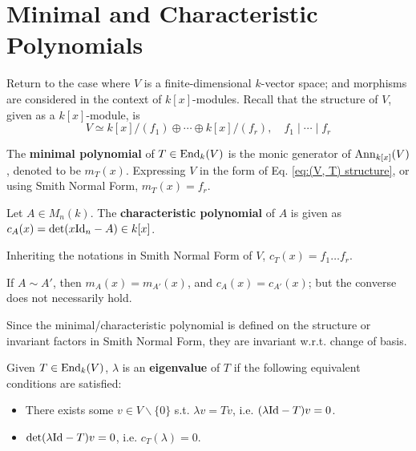 \documentclass{article}
\begin{document}
\section{Minimal and Characteristic Polynomials}

Return to the case where $V$ is a finite-dimensional $k$-vector space; and morphisms are considered in the context of $k[x]$-modules. Recall that the structure of $V$, given as a $k[x]$-module, is 
\[
    V \simeq k[x]/(f_1) \oplus \cdots \oplus k[x]/(f_r), \quad f_1 \mid \cdots \mid f_r
\]

\begin{definition}
    The \textbf{minimal polynomial} of $T\in \mathrm{End}_{k}(V)$ is the monic generator of $\mathrm{Ann}_{k[x]}(V)$, denoted to be $m_T(x)$. Expressing $V$ in the form of Eq. \eqref{eq:(V, T) structure}, or using Smith Normal Form, $m_T(x) = f_r$.
\end{definition}

\begin{definition}
    Let $A \in M_n(k)$. The \textbf{characteristic polynomial} of $A$ is given as $c_A(x) = \det(x\mathrm{Id}_n - A) \in k[x]$. 
\end{definition}

\begin{remark}
    Inheriting the notations in Smith Normal Form of $V$, $c_T(x) = f_1\ldots f_r$.
\end{remark}

\begin{remark}
    If $A \sim A'$, then $m_A(x) = m_{A'}(x)$, and $c_A(x) = c_{A'}(x)$; but the converse does not necessarily hold.
\end{remark}

\begin{remark}
    Since the minimal/characteristic polynomial is defined on the structure or invariant factors in Smith Normal Form, they are invariant w.r.t. change of basis.
\end{remark}

\begin{definition}[Eigenvalue]
    Given $T \in \mathrm{End}_k(V)$, $\lambda$ is an \textbf{eigenvalue} of $T$ if the following equivalent conditions are satisfied:
    \begin{itemize}
        \item There exists some $v\in V \smallsetminus\{0\}$ s.t. $\lambda v = T v$, i.e. $(\lambda \mathrm{Id} - T)v = 0$.
        \item $\det(\lambda \mathrm{Id} - T)v = 0$, i.e. $c_T(\lambda) = 0$.
    \end{itemize}
\end{definition}
\end{document}
